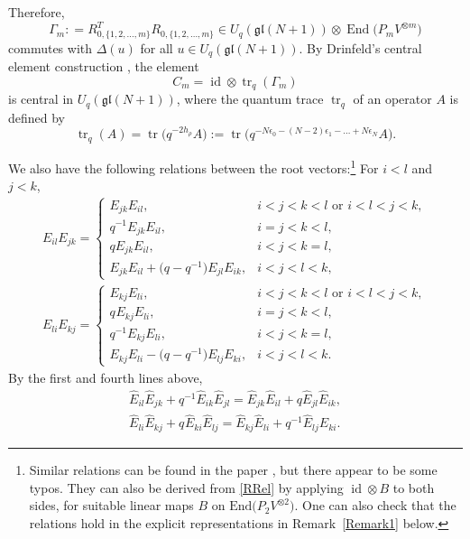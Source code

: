 \documentclass[pdftex]{sigma}
\numberwithin{equation}{section}
\DeclareMathOperator{\End}{End}
\DeclareMathOperator{\tr}{tr}
\DeclareMathOperator{\id}{id}
\newcommand{\Uqgl}{{U_q(\mathfrak{gl}(N+1))}}
\begin{document}
Therefore,
\begin{equation*}
\Gamma_m: = R^T_{0,\{1,2,\dots,m\}} R_{0,\{1,2,\dots,m\}} \in \Uqgl \otimes \End \big(P_m V^{\otimes m}\big)
\end{equation*}
commutes with $ \Delta (u) $ for all $u\in \Uqgl$. By Drinfeld's central element construction \cite{Drin90}, the element
\begin{equation*}
C_m= \id \otimes\tr_q(\Gamma_m)
\end{equation*}
is central in $\Uqgl$, where the quantum trace $ \tr_q $ of an operator $A$ is defined by
\begin{equation*}%
\tr_q(A) = \tr\big(q^{-2h_{\rho}}A\big) := \tr \big(q^{-N\epsilon_0-(N-2)\epsilon_1 - \dots +N\epsilon_N}A\big).
\end{equation*}

We also have the following relations between the root vectors:\footnote{Similar relations can be found in the paper \cite{Xi1994}, but there appear to be some typos. They can also be derived from \eqref{RRel} by applying $\id \otimes B$ to both sides, for suitable linear maps $B$ on $\mathrm{End}\big(P_2V^{\otimes 2}\big)$. One can also check that the relations hold in the explicit representations in Remark~\ref{Remark1} below.}
For $i<l$ and $j<k$,
\begin{gather}\label{comm}
{E}_{il}{E}_{jk} =
\begin{cases}
{E}_{jk}{E}_{il}, & i< j < k < l \text{ or } i<l<j<k,\\
q^{-1} {E}_{jk}{E}_{il}, & i=j<k<l, \\
q {E}_{jk}{E}_{il}, & i<j<k=l,\\
{E}_{jk}{E}_{il} + \big(q-q^{-1}\big) {E}_{jl}{E}_{ik}, & i<j<l<k,
\end{cases}
\\
\label{comm1}
{E}_{li}{E}_{kj} =
\begin{cases}
{E}_{kj}{E}_{li}, & i< j < k < l \text{ or } i<l<j<k,\\
q^{} {E}_{kj}{E}_{li}, & i=j<k<l, \\
q^{-1} {E}_{kj}{E}_{li}, & i<j<k=l,\\
{E}_{kj}{E}_{li} - \big(q-q^{-1}\big) {E}_{lj}{E}_{ki}, & i<j<l<k.
\end{cases}
\end{gather}
By the first and fourth lines above,
\begin{gather}\label{comm2}
\hat{E}_{il}\hat{E}_{jk} + q^{-1} \hat{E}_{ik}\hat{E}_{jl} = \hat{E}_{jk}\hat{E}_{il} + q \hat{E}_{jl}\hat{E}_{ik}, \\
\hat{E}_{li}\hat{E}_{kj} + q^{} \hat{E}_{ki}\hat{E}_{lj} = \hat{E}_{kj}\hat{E}_{li} + q^{-1} \hat{E}_{lj}\hat{E}_{ki}. \label{comm3}
\end{gather}
\end{document}
